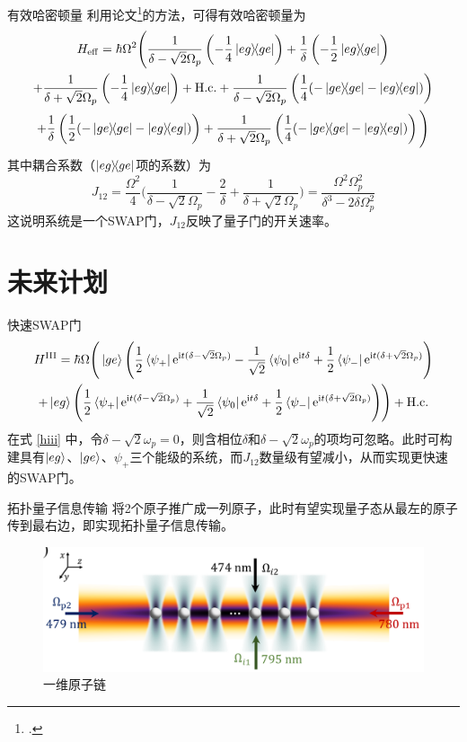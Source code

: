\documentclass[10pt,aspectratio=43]{beamer}
\begin{document}
\begin{frame}{有效哈密顿量}
利用论文\footcite{James2007EffectiveHT}的方法，可得有效哈密顿量为
{\footnotesize\begin{multline}
H_{\mathrm{eff}}=\hbar\Omega^2\Bigg(\frac{1}{\delta-\sqrt{2}\Omega_p}\left(-\frac{1}{4}\ketbra{eg}{ge}\right)+\frac{1}{\delta}\left(-\frac{1}{2}\ketbra{eg}{ge}\right)\\
+\frac{1}{\delta+\sqrt{2}\Omega_p}\left(-\frac{1}{4}\ketbra{eg}{ge}\right)+\mathrm{H.c.}
+\frac{1}{\delta-\sqrt{2}\Omega_p}\left(\frac{1}{4}(-\ketbra{ge}{ge}-\ketbra{eg}{eg})\right)\\
+\frac{1}{\delta}\left(\frac{1}{2}(-\ketbra{ge}{ge}-\ketbra{eg}{eg})\right)
+\frac{1}{\delta+\sqrt{2}\Omega_p}\left(\frac{1}{4}(-\ketbra{ge}{ge}-\ketbra{eg}{eg})\right)\Bigg)
\end{multline}}
其中耦合系数（$ \ketbra{eg}{ge} $项的系数）为
{\small\begin{equation}
J_{12}=\frac{\Omega^2}{4}\Bigg(\frac{1}{\delta-\sqrt{2}\Omega_p}-\frac{2}{\delta}+\frac{1}{\delta+\sqrt{2}\Omega_p}\Bigg)=\frac{\Omega^2\Omega_p^2}{\delta^3-2\delta\Omega_p^2}
\end{equation}}
这说明系统是一个SWAP门，$ J_{12} $反映了量子门的开关速率。
\end{frame}
\section{未来计划}
\begin{frame}{快速SWAP门}
\begin{multline*}
H^{\mathrm{III}}=\hbar\Omega\Bigg(\ket{ge}\Bigg(\frac{1}{2}\bra{\psi_+}\mathrm{e}^{\mathrm{i}t(\delta-\sqrt{2}\Omega_p)}-\frac{1}{\sqrt{2}}\bra{\psi_0}\mathrm{e}^{\mathrm{i}t \delta}+\frac{1}{2}\bra{\psi_-}\mathrm{e}^{\mathrm{i}t (\delta+\sqrt{2}\Omega_p)}\Bigg)\\
+\ket{eg}\Bigg(\frac{1}{2}\bra{\psi_+}\mathrm{e}^{\mathrm{i}t(\delta-\sqrt{2}\Omega_p)}+\frac{1}{\sqrt{2}}\bra{\psi_0}\mathrm{e}^{\mathrm{i}t \delta}+\frac{1}{2}\bra{\psi_-}\mathrm{e}^{\mathrm{i}t (\delta+\sqrt{2}\Omega_p)}\Bigg)\Bigg)+\mathrm{H.c.}
\end{multline*}
在式 \eqref{hiii} 中，令$ \delta-\sqrt{2}\omega_p=0 $，则含相位$ \delta $和$ \delta-\sqrt{2}\omega_p $的项均可忽略。此时可构建具有$ \ket{eg} $、$ \ket{ge} $、$ \psi_+ $三个能级的系统，而$ J_{12} $数量级有望减小，从而实现更快速的SWAP门。
\end{frame}
\begin{frame}{拓扑量子信息传输}
将2个原子推广成一列原子，此时有望实现量子态从最左的原子传到最右边，即实现拓扑量子信息传输。
\begin{figure}
\centering
\includegraphics[width=0.7\linewidth]{figures/pra-energy-level-n}
\caption{一维原子链}
\label{fig:pra-energy-level-n}
\end{figure}

\end{frame}
\end{document}
